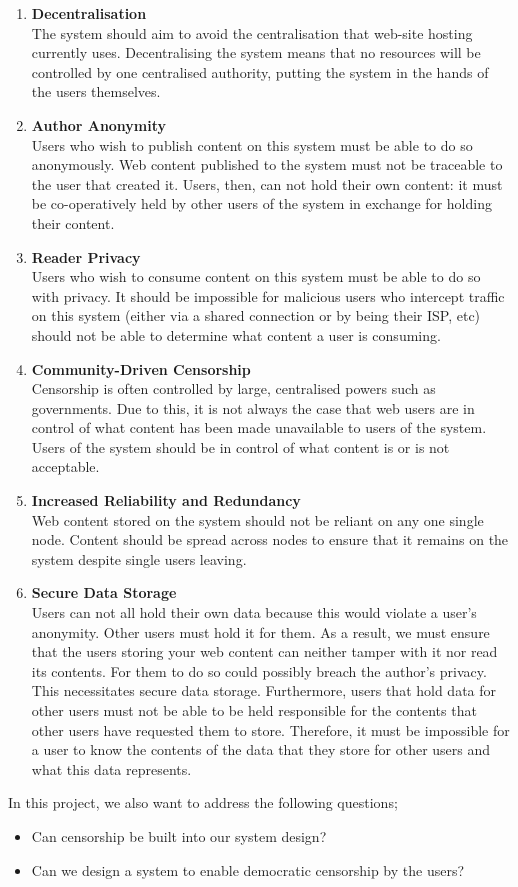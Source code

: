 \begin{enumerate}

    \item{\textbf{Decentralisation} \\
The system should aim to avoid the centralisation that web-site hosting currently uses.
Decentralising the system means that no resources will be controlled by one centralised
authority, putting the system in the hands of the users themselves.
        }

    \item{\textbf{Author Anonymity} \\
Users who wish to publish content on this system must be able to do so anonymously.
Web content published to the system must not be traceable to the user that created it.
Users, then, can not hold their own content: it must be co-operatively held by other
users of the system in exchange for holding their content.
        }

    \item{\textbf{Reader Privacy} \\
Users who wish to consume content on this system must be able to do so with privacy.
It should be impossible for malicious users who intercept traffic on this system
(either via a shared connection or by being their ISP,  etc) should not be able to
determine what content a user is consuming.
        }

    \item{\textbf{Community-Driven Censorship} \\
Censorship is often controlled by large, centralised powers such as governments.
Due to this, it is not always the case that web users are in control of what content
has been made unavailable to users of the system. Users of the system should be
in control of what content is or is not acceptable.
        }

    \item{\textbf{Increased Reliability and Redundancy} \\
Web content stored on the system should not be reliant on any one single node.
Content should be spread across nodes to ensure that it remains on the system despite
single users leaving.
        }

    \item{\textbf{Secure Data Storage} \\
Users can not all hold their own data because this would violate a user's anonymity.
Other users must hold it for them. As a result, we must ensure that the users storing
your web content can neither tamper with it nor read its contents. For them to do so could
possibly breach the author’s privacy. This necessitates secure data storage.
Furthermore, users that hold data for other users must not be able to be held responsible
for the contents that other users have requested them to store. Therefore, it must be
impossible for a user to know the contents of the data that they store for other users
and what this data represents.
        }
\end{enumerate}

In this project, we also want to address the following questions;

\begin{itemize}
    \item Can censorship be built into our system design?
    \item Can we design a system to enable democratic censorship by the users?
\end{itemize}


